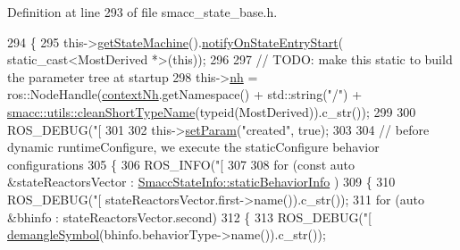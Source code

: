 Definition at line 293 of file smacc\+\_\+state\+\_\+base.\+h.


\begin{DoxyCode}
294   \{
295     this->\hyperlink{classsmacc_1_1SmaccState_afc39f8e0ca4001b2159a100da2fccd0e}{getStateMachine}().\hyperlink{classsmacc_1_1ISmaccStateMachine_aeec54e997d715b105ebfeb5caadc4fbf}{notifyOnStateEntryStart}(
      static\_cast<MostDerived *>(\textcolor{keyword}{this}));
296 
297     \textcolor{comment}{// TODO: make this static to build the parameter tree at startup}
298     this->\hyperlink{classsmacc_1_1ISmaccState_a13fe6e6abfdb87996402189d44b78494}{nh} = ros::NodeHandle(\hyperlink{classsmacc_1_1ISmaccState_ae59191a663a08489b7d10036f3b25238}{contextNh}.getNamespace() + std::string(\textcolor{stringliteral}{"/"}) + 
      \hyperlink{namespacesmacc_1_1utils_aacd1975bb7cd9bec4b50e111a2ae7edb}{smacc::utils::cleanShortTypeName}(\textcolor{keyword}{typeid}(MostDerived)).c\_str());
299 
300     ROS\_DEBUG(\textcolor{stringliteral}{"[%
301 
302     this->\hyperlink{classsmacc_1_1ISmaccState_a0b6c531ca8c446052022308548f55b92}{setParam}(\textcolor{stringliteral}{"created"}, \textcolor{keyword}{true});
303 
304     \textcolor{comment}{// before dynamic runtimeConfigure, we execute the staticConfigure behavior configurations}
305     \{
306       ROS\_INFO(\textcolor{stringliteral}{"[%
307 
308       \textcolor{keywordflow}{for} (\textcolor{keyword}{const} \textcolor{keyword}{auto} &stateReactorsVector : \hyperlink{classsmacc_1_1introspection_1_1SmaccStateInfo_ad3d8b3450060cb0b91f38fb2fe0a7678}{SmaccStateInfo::staticBehaviorInfo}
      )
309       \{
310         ROS\_DEBUG(\textcolor{stringliteral}{"[%
      stateReactorsVector.first->name()).c\_str());
311         \textcolor{keywordflow}{for} (\textcolor{keyword}{auto} &bhinfo : stateReactorsVector.second)
312         \{
313           ROS\_DEBUG(\textcolor{stringliteral}{"[%
      \hyperlink{namespacesmacc_1_1introspection_a2f495108db3e57604d8d3ff5ef030302}{demangleSymbol}(bhinfo.behaviorType->name()).c\_str());
}}}}
\end{DoxyCode}
